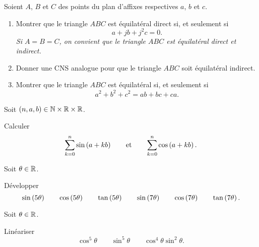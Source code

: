 \begin{corr}
\end{corr}

\begin{exo}[Exercice 9]
Soient \(A\), \(B\) et \(C\) des points du plan d'affixes respectives \(a\), \(b\) et \(c\).

\begin{enumerate}
\item Montrer que le triangle \(ABC\) est équilatéral direct si, et seulement si \[a+jb+j^2c=0.\] \textit{\small Si \(A=B=C\), on convient que le triangle \(ABC\) est équilatéral direct et indirect.} \\

\item Donner une CNS analogue pour que le triangle \(ABC\) soit équilatéral indirect. \\

\item Montrer que le triangle \(ABC\) est équilatéral si, et seulement si \[a^2+b^2+c^2=ab+bc+ca.\]
\end{enumerate}
\end{exo}

\begin{corr}
\end{corr}

\begin{exo}[Exercice 10]
Soit \(\left(n,a,b\right)\in\mathbb{N}\times\mathbb{R}\times\mathbb{R}\).

Calculer \[\sum_{k=0}^{n}\sin\left(a+kb\right)\qquad\text{et}\qquad\sum_{k=0}^{n}\cos\left(a+kb\right).\]
\end{exo}

\begin{corr}
\end{corr}

\begin{exo}[Exercice 11]
Soit \(\theta\in\mathbb{R}\).

Développer \[\sin\left(5\theta\right)\qquad\cos\left(5\theta\right)\qquad\tan\left(5\theta\right)\qquad\sin\left(7\theta\right)\qquad\cos\left(7\theta\right)\qquad\tan\left(7\theta\right).\]
\end{exo}

\begin{corr}
\end{corr}

\begin{exo}[Exercice 12]
Soit \(\theta\in\mathbb{R}\).

Linéariser \[\cos^5\theta\qquad\sin^5\theta\qquad\cos^4\theta\sin^2\theta.\]
\end{exo}

